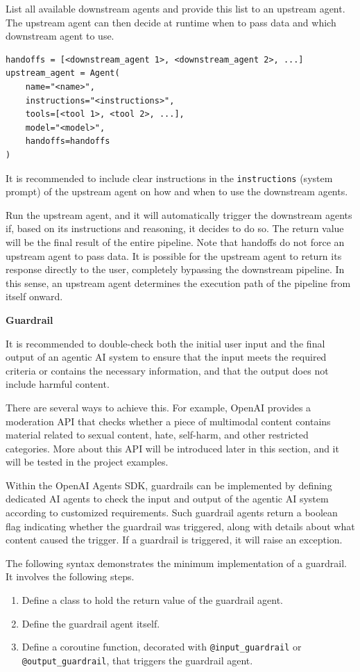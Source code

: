 List all available downstream agents and provide this list to an upstream agent. The upstream agent can then decide at runtime when to pass data and which downstream agent to use.
\begin{lstlisting}
handoffs = [<downstream_agent 1>, <downstream_agent 2>, ...]
upstream_agent = Agent(
    name="<name>",
    instructions="<instructions>",
    tools=[<tool 1>, <tool 2>, ...],
    model="<model>",
    handoffs=handoffs
)
\end{lstlisting}

It is recommended to include clear instructions in the \verb|instructions| (system prompt) of the upstream agent on how and when to use the downstream agents.

Run the upstream agent, and it will automatically trigger the downstream agents if, based on its instructions and reasoning, it decides to do so. The return value will be the final result of the entire pipeline. Note that handoffs do not force an upstream agent to pass data. It is possible for the upstream agent to return its response directly to the user, completely bypassing the downstream pipeline. In this sense, an upstream agent determines the execution path of the pipeline from itself onward.

\vspace{0.1in}
\noindent \textbf{Guardrail}
\vspace{0.1in}

It is recommended to double-check both the initial user input and the final output of an agentic AI system to ensure that the input meets the required criteria or contains the necessary information, and that the output does not include harmful content.

There are several ways to achieve this. For example, OpenAI provides a moderation API that checks whether a piece of multimodal content contains material related to sexual content, hate, self-harm, and other restricted categories. More about this API will be introduced later in this section, and it will be tested in the project examples.

Within the OpenAI Agents SDK, guardrails can be implemented by defining dedicated AI agents to check the input and output of the agentic AI system according to customized requirements. Such guardrail agents return a boolean flag indicating whether the guardrail was triggered, along with details about what content caused the trigger. If a guardrail is triggered, it will raise an exception.

The following syntax demonstrates the minimum implementation of a guardrail. It involves the following steps.
\begin{enumerate}
	\item Define a class to hold the return value of the guardrail agent. 
	\item Define the guardrail agent itself.  
	\item Define a coroutine function, decorated with \verb|@input_guardrail| or \verb|@output_guardrail|, that triggers the guardrail agent.
\end{enumerate}

